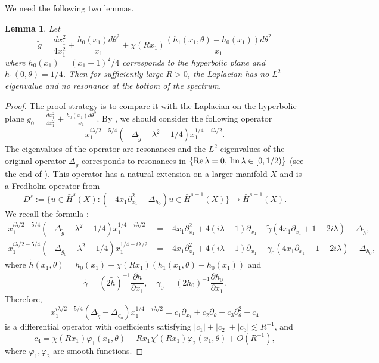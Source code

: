 \documentclass[10pt]{amsart}
\newtheorem{lemma}[theorem]{Lemma}
\renewcommand{\Re}{\rm{Re} \,}
\renewcommand{\Im}{\rm{Im} \,}
\newcommand{\1}{{\bf 1}}
\begin{document}
We need the following two lemmas.
\begin{lemma}\label{lemma:no-eigen}
    Let
\begin{equation*}
    \tilde g=\frac{dx_1^2}{4x_1^2}+\frac{h_0(x_1)d\theta^2}{x_1}+\chi(Rx_1)\frac{(h_1(x_1,\theta)-h_0(x_1))d\theta^2}{x_1}
\end{equation*}
where $h_0(x_1)=(x_1-1)^2/4$ corresponds to the hyperbolic plane and $h_1(0,\theta)=1/4$.
Then for sufficiently large $R>0$, the Laplacian has no $L^2$ eigenvalue and no resonance at the bottom of the spectrum. 
\end{lemma}
\begin{proof}
The proof strategy is to compare it with the Laplacian on the hyperbolic plane $g_0=\frac{dx_1^2}{4x_1^2}+\frac{h_0(x_1)d\theta^2}{x_1}$. By \cite[Section 5.3]{dyatlov2019mathematical}, we should consider the following operator
\begin{equation*}
    x_1^{i\lambda/2-5/4}(-\Delta_{\tilde g}-\lambda^2-1/4) x_1^{1/4-i\lambda/2}.
\end{equation*}
The eigenvalues of the operator are resonances and the $L^2$ eigenvalues of the original operator $\Delta_{\tilde g}$ corresponds to resonances in $\{\Re \lambda=0, \, \Im \lambda \in [0,1/2)\}$ (see the end of \cite[Section 5.2]{dyatlov2019mathematical}).
This operator has a natural extension on a larger manifold $X$ and is a Fredholm operator from 
\begin{equation*}
    D^s:=\{u \in \bar{H}^s(X): (-4x_1\partial_{x_1}^2-\Delta_{h_0}) u \in \bar{H}^{s-1}(X)  \}\to  \bar{H}^{s-1}(X).
\end{equation*}
We recall the formula \cite[Lemma 5.10]{dyatlov2019mathematical}:
\begin{equation*}
\begin{split}
     x_1^{i\lambda/2-5/4}(-\Delta_{\tilde g}-\lambda^2-1/4) x_1^{1/4-i\lambda/2} &= -4x_1\partial_{x_1}^2+4(i\lambda-1)\partial_{x_1}-\tilde \gamma(4x_1\partial_{x_1}+1-2i\lambda)-\Delta_{\tilde h},\\
     x_1^{i\lambda/2-5/4}(-\Delta_{g_0}-\lambda^2-1/4) x_1^{1/4-i\lambda/2} &= -4x_1\partial_{x_1}^2+4(i\lambda-1)\partial_{x_1}-\gamma_0(4x_1\partial_{x_1}+1-2i\lambda)-\Delta_{h_0},
\end{split}
\end{equation*}
where $\tilde h(x_1,\theta)=h_0(x_1)+ \chi(Rx_1)(h_1(x_1,\theta)-h_0(x_1))$ and
\begin{equation*}
    \tilde \gamma=(2\tilde h)^{-1}\frac{\partial \tilde h}{\partial x_1},\quad \gamma_0=(2h_0)^{-1}\frac{\partial h_0}{\partial x_1}.
\end{equation*}
Therefore,
\begin{equation*}
    x_1^{i\lambda/2-5/4}(\Delta_{\tilde g}-\Delta_{g_0})x_1^{1/4-i\lambda/2}=c_1 \partial_{x_1}+c_2\partial_{\theta}+c_3\partial_{\theta}^2+c_4
\end{equation*}
is a differential operator with coefficients satisfying $|c_1|+|c_2|+|c_3|\lesssim R^{-1}$, and $$c_4=\chi(Rx_1) \varphi_1(x_1,\theta)+Rx_1\chi'(Rx_1)\varphi_2(x_1,\theta)+O(R^{-1}),
$$ where $\varphi_1,\varphi_2$ are smooth functions. 


\end{proof}
\end{document}

